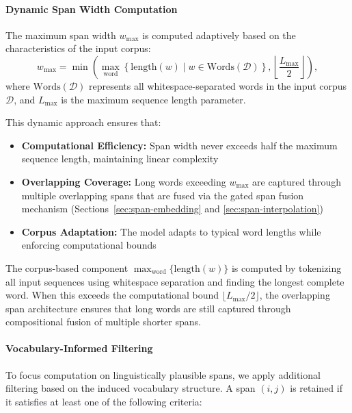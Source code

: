 \paragraph{Dynamic Span Width Computation}

The maximum span width \(w_{\max}\) is computed adaptively based on the characteristics of the input corpus:
\begin{equation}
w_{\max} = \min\left(\max_{\text{word}} \left\{\text{length}(w) \mid w \in \text{Words}(\mathcal{D})\right\}, \left\lfloor \frac{L_{\max}}{2} \right\rfloor\right),
\label{eq:dynamic-w-max}
\end{equation}
where \(\text{Words}(\mathcal{D})\) represents all whitespace-separated words in the input corpus \(\mathcal{D}\), and \(L_{\max}\) is the maximum sequence length parameter.

This dynamic approach ensures that:
\begin{itemize}
	\item \textbf{Computational Efficiency:} Span width never exceeds half the maximum sequence length, maintaining linear complexity
	\item \textbf{Overlapping Coverage:} Long words exceeding \(w_{\max}\) are captured through multiple overlapping spans that are fused via the gated span fusion mechanism (Sections~\ref{sec:span-embedding} and \ref{sec:span-interpolation})
	\item \textbf{Corpus Adaptation:} The model adapts to typical word lengths while enforcing computational bounds
\end{itemize}

The corpus-based component \(\max_{\text{word}} \{\text{length}(w)\}\) is computed by tokenizing all input sequences using whitespace separation and finding the longest complete word. When this exceeds the computational bound \(\lfloor L_{\max}/2 \rfloor\), the overlapping span architecture ensures that long words are still captured through compositional fusion of multiple shorter spans.

\paragraph{Vocabulary-Informed Filtering}

To focus computation on linguistically plausible spans, we apply additional filtering based on the induced vocabulary structure. A span \((i,j)\) is retained if it satisfies at least one of the following criteria:

